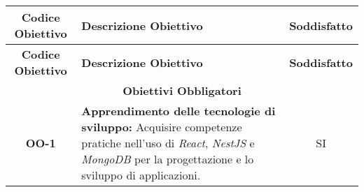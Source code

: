 \begin{longtable}{|c|>{\centering\arraybackslash}p{}|c|} %
    \hline
    \rowcolor{green!30} %
    \textbf{Codice Obiettivo} & \textbf{Descrizione Obiettivo} & \textbf{Soddisfatto}\\
    \hline
    \endfirsthead %
    
    \hline
    \rowcolor{green!30} %
    \textbf{Codice Obiettivo} & \textbf{Descrizione Obiettivo} & \textbf{Soddisfatto}\\
    \hline
    \endhead %
    
    \hline
    \multicolumn{3}{|c|}{\rowcolor{green!30} \textbf{Obiettivi Obbligatori}}  \\
    \hline %
    \textbf{OO-1} & \textbf{Apprendimento delle tecnologie di sviluppo:} Acquisire competenze pratiche nell'uso di \textit{React}, \textit{NestJS} e \textit{MongoDB} per la progettazione e lo sviluppo di applicazioni. & SI \\


\end{longtable}
